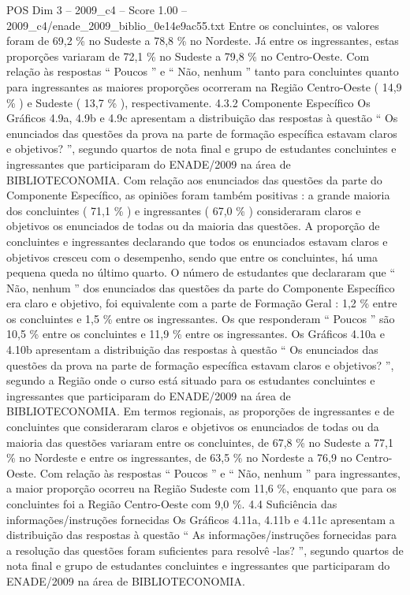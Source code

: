 \begin{textsample}{POS Dim 3 – 2009\_c4 – Score 1.00 – 2009\_c4/enade\_2009\_biblio\_0e14e9ac55.txt}
Entre os concluintes, os valores foram de 69,2 \% no Sudeste a 78,8 \% no Nordeste.
Já entre os ingressantes, estas proporções variaram de 72,1 \% no Sudeste a 79,8 \% no Centro-Oeste.
Com relação às respostas “ Poucos ” e “ Não, nenhum ” tanto para concluintes quanto para ingressantes as maiores proporções ocorreram na Região Centro-Oeste ( 14,9 \% ) e Sudeste ( 13,7 \% ), respectivamente. 4.3.2 Componente Específico Os Gráficos 4.9a, 4.9b e 4.9c apresentam a distribuição das respostas à questão “ Os enunciados das questões da prova na parte de formação específica estavam claros e objetivos? ”, segundo quartos de nota final e grupo de estudantes concluintes e ingressantes que participaram do ENADE/2009 na área de BIBLIOTECONOMIA.
Com relação aos enunciados das questões da parte do Componente Específico, as opiniões foram também positivas : a grande maioria dos concluintes ( 71,1 \% ) e ingressantes ( 67,0 \% ) consideraram claros e objetivos os enunciados de todas ou da maioria das questões.
A proporção de concluintes e ingressantes declarando que todos os enunciados estavam claros e objetivos cresceu com o desempenho, sendo que entre os concluintes, há uma pequena queda no último quarto.
O número de estudantes que declararam que “ Não, nenhum ” dos enunciados das questões da parte do Componente Específico era claro e objetivo, foi equivalente com a parte de Formação Geral : 1,2 \% entre os concluintes e 1,5 \% entre os ingressantes.
Os que responderam “ Poucos ” são 10,5 \% entre os concluintes e 11,9 \% entre os ingressantes.
Os Gráficos 4.10a e 4.10b apresentam a distribuição das respostas à questão “ Os enunciados das questões da prova na parte de formação específica estavam claros e objetivos? ”, segundo a Região onde o curso está situado para os estudantes concluintes e ingressantes que participaram do ENADE/2009 na área de BIBLIOTECONOMIA.
Em termos regionais, as proporções de ingressantes e de concluintes que consideraram claros e objetivos os enunciados de todas ou da maioria das questões variaram entre os concluintes, de 67,8 \% no Sudeste a 77,1 \% no Nordeste e entre os ingressantes, de 63,5 \% no Nordeste a 76,9 no Centro-Oeste.
Com relação às respostas “ Poucos ” e “ Não, nenhum ” para ingressantes, a maior proporção ocorreu na Região Sudeste com 11,6 \%, enquanto que para os concluintes foi a Região Centro-Oeste com 9,0 \%. 4.4 Suficiência das informações/instruções fornecidas Os Gráficos 4.11a, 4.11b e 4.11c apresentam a distribuição das respostas à questão “ As informações/instruções fornecidas para a resolução das questões foram suficientes para resolvê -las? ”, segundo quartos de nota final e grupo de estudantes concluintes e ingressantes que participaram do ENADE/2009 na área de BIBLIOTECONOMIA.

\end{textsample}
